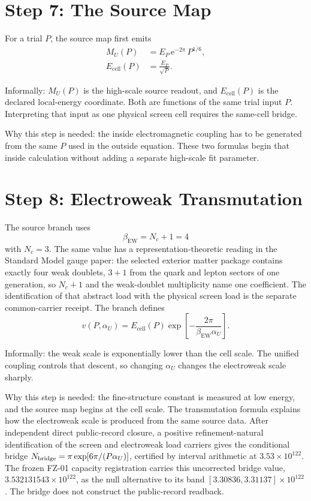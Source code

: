 \documentclass[11pt]{article}
\theoremstyle{remark}
\newcommand{\e}{\mathrm e}
\newcommand{\Nc}{N_c}
\begin{document}
\section{Step 7: The Source Map}

For a trial \(P\), the source map first emits
\begin{align}
M_U(P)&=E_P\,\e^{-2\pi}\,P^{1/6},
\label{eq:MU}\\
E_{\mathrm{cell}}(P)&=\frac{E_P}{\sqrt P}.
\label{eq:Ecell}
\end{align}

Informally: \(M_U(P)\) is the high-scale source readout, and \(E_{\mathrm{cell}}(P)\) is the declared local-energy coordinate. Both are functions of the same trial input \(P\). Interpreting that input as one physical screen cell requires the same-cell bridge.

Why this step is needed: the inside electromagnetic coupling has to be generated from the same \(P\) used in the outside equation. These two formulas begin that inside calculation without adding a separate high-scale fit parameter.

\section{Step 8: Electroweak Transmutation}

The source branch uses
\begin{equation}
\beta_{\mathrm{EW}}=\Nc+1=4
\end{equation}
with \(\Nc=3\). The same value has a representation-theoretic reading in the
Standard Model gauge paper: the selected exterior matter package contains exactly four weak
doublets, \(3+1\) from the quark and lepton sectors of one generation, so
\(\Nc+1\) and the weak-doublet multiplicity name one coefficient. The
identification of that abstract load with the physical screen load is the
separate common-carrier receipt. The branch defines
\begin{equation}
v(P,\alpha_U)
=
E_{\mathrm{cell}}(P)
\exp\!\left[-\frac{2\pi}{\beta_{\mathrm{EW}}\alpha_U}\right].
\label{eq:v}
\end{equation}

Informally: the weak scale is exponentially lower than the cell scale. The unified coupling controls that descent, so changing \(\alpha_U\) changes the electroweak scale sharply.

Why this step is needed: the fine-structure constant is measured at low energy, and the source map begins at the cell scale. The transmutation formula explains how the electroweak scale is produced from the same source data. After independent direct public-record closure, a positive refinement-natural identification of the screen and electroweak load carriers gives the conditional bridge \(N_{\rm bridge}=\pi\exp[6\pi/(P\alpha_U)]\), certified by interval arithmetic at \(3.53\times10^{122}\). The frozen FZ-01 capacity registration carries this uncorrected bridge value, \(3.532131543\times10^{122}\), as the null alternative to its band \([3.30836,3.31137]\times10^{122}\) \cite{ophladder}. The bridge does not construct the public-record readback.
\end{document}
